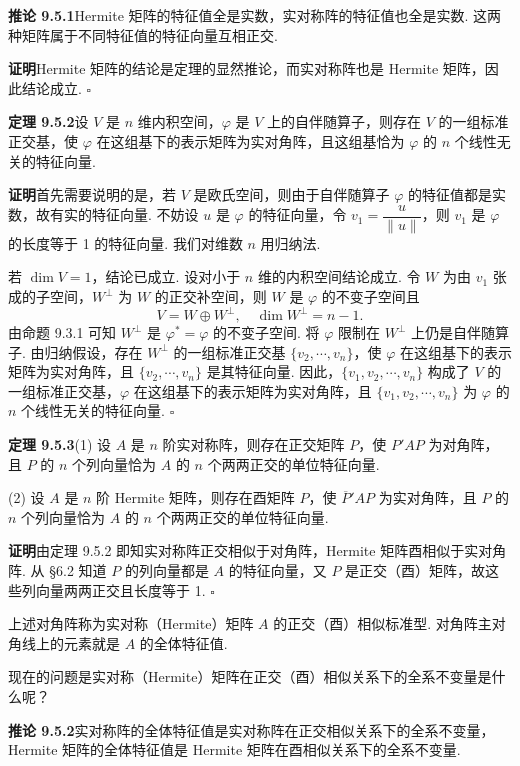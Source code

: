 \documentclass[UTF8,12pt,a4paper,fontset=fandol]{ctexart}
\begin{document}
\noindent\textbf{推论 9.5.1}\quad Hermite 矩阵的特征值全是实数，实对称阵的特征值也全是实数. 这两种矩阵属于不同特征值的特征向量互相正交.

\noindent\textbf{证明}\quad Hermite 矩阵的结论是定理的显然推论，而实对称阵也是 Hermite 矩阵，因此结论成立. $\square$

\noindent\textbf{定理 9.5.2}\quad 设 $V$ 是 $n$ 维内积空间，$\varphi$ 是 $V$ 上的自伴随算子，则存在 $V$ 的一组标准正交基，使 $\varphi$ 在这组基下的表示矩阵为实对角阵，且这组基恰为 $\varphi$ 的 $n$ 个线性无关的特征向量.

\noindent\textbf{证明}\quad 首先需要说明的是，若 $V$ 是欧氏空间，则由于自伴随算子 $\varphi$ 的特征值都是实数，故有实的特征向量. 不妨设 $u$ 是 $\varphi$ 的特征向量，令 $v_1=\dfrac{u}{\|u\|}$，则 $v_1$ 是 $\varphi$ 的长度等于 1 的特征向量. 我们对维数 $n$ 用归纳法.

若 $\dim V=1$，结论已成立. 设对小于 $n$ 维的内积空间结论成立. 令 $W$ 为由 $v_1$ 张成的子空间，$W^\perp$ 为 $W$ 的正交补空间，则 $W$ 是 $\varphi$ 的不变子空间且
\[
  V=W\oplus W^\perp,\quad \dim W^\perp=n-1.
\]
由命题 9.3.1 可知 $W^\perp$ 是 $\varphi^*=\varphi$ 的不变子空间. 将 $\varphi$ 限制在 $W^\perp$ 上仍是自伴随算子. 由归纳假设，存在 $W^\perp$ 的一组标准正交基 $\{v_2,\cdots,v_n\}$，使 $\varphi$ 在这组基下的表示矩阵为实对角阵，且 $\{v_2,\cdots,v_n\}$ 是其特征向量. 因此，$\{v_1,v_2,\cdots,v_n\}$ 构成了 $V$ 的一组标准正交基，$\varphi$ 在这组基下的表示矩阵为实对角阵，且 $\{v_1,v_2,\cdots,v_n\}$ 为 $\varphi$ 的 $n$ 个线性无关的特征向量. $\square$

\noindent\textbf{定理 9.5.3}\quad (1) 设 $A$ 是 $n$ 阶实对称阵，则存在正交矩阵 $P$，使 $P'AP$ 为对角阵，且 $P$ 的 $n$ 个列向量恰为 $A$ 的 $n$ 个两两正交的单位特征向量.

(2) 设 $A$ 是 $n$ 阶 Hermite 矩阵，则存在酉矩阵 $P$，使 $\overline P'AP$ 为实对角阵，且 $P$ 的 $n$ 个列向量恰为 $A$ 的 $n$ 个两两正交的单位特征向量.

\noindent\textbf{证明}\quad 由定理 9.5.2 即知实对称阵正交相似于对角阵，Hermite 矩阵酉相似于实对角阵. 从 §6.2 知道 $P$ 的列向量都是 $A$ 的特征向量，又 $P$ 是正交（酉）矩阵，故这些列向量两两正交且长度等于 1. $\square$

上述对角阵称为实对称（Hermite）矩阵 $A$ 的正交（酉）相似标准型. 对角阵主对角线上的元素就是 $A$ 的全体特征值.

现在的问题是实对称（Hermite）矩阵在正交（酉）相似关系下的全系不变量是什么呢？

\noindent\textbf{推论 9.5.2}\quad 实对称阵的全体特征值是实对称阵在正交相似关系下的全系不变量，Hermite 矩阵的全体特征值是 Hermite 矩阵在酉相似关系下的全系不变量.
\end{document}
